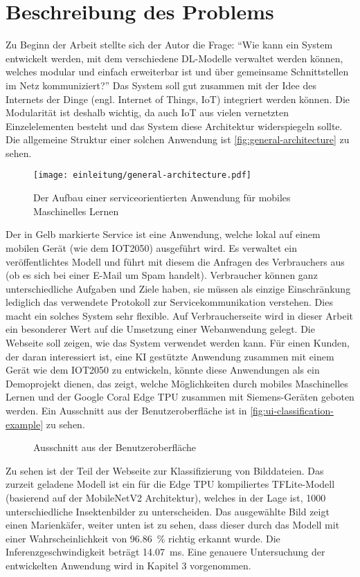 \section{Beschreibung des Problems}
Zu Beginn der Arbeit stellte sich der Autor die Frage:
\enquote{Wie kann ein System entwickelt werden, mit dem verschiedene DL-Modelle
  verwaltet werden können, welches modular und einfach erweiterbar ist
  und über gemeinsame Schnittstellen im Netz kommuniziert?}
Das System soll gut zusammen mit der Idee des Internets der Dinge
(engl. Internet of Things, IoT) integriert werden können.
Die Modularität ist deshalb wichtig, da auch IoT aus vielen vernetzten
Einzelelementen besteht und das System diese Architektur widerspiegeln sollte.
Die allgemeine Struktur einer solchen Anwendung ist \autoref{fig:general-architecture} zu
sehen. 
\begin{figure}[h!]
  \centering
  \texttt{[image: einleitung/general-architecture.pdf]}
  \caption{Der Aufbau einer serviceorientierten Anwendung für mobiles Maschinelles Lernen}
  \label{fig:general-architecture}
\end{figure}

\noindent
Der in Gelb markierte Service ist eine Anwendung, welche
lokal auf einem mobilen Gerät (wie dem IOT2050) ausgeführt wird.
Es verwaltet ein veröffentlichtes Modell und führt mit diesem
die Anfragen des Verbrauchers aus (\zB ob es sich bei einer E-Mail um Spam handelt).
Verbraucher können ganz unterschiedliche Aufgaben und Ziele haben, sie müssen
als einzige Einschränkung lediglich das verwendete Protokoll
zur Servicekommunikation verstehen.
Dies macht ein solches System sehr flexible.
Auf Verbraucherseite wird in dieser Arbeit
ein besonderer Wert auf die Umsetzung einer Webanwendung gelegt.
Die Webseite soll zeigen, wie das System verwendet
werden kann. Für einen Kunden, der daran interessiert ist, eine
KI gestützte Anwendung zusammen mit einem Gerät wie dem IOT2050
zu entwickeln, könnte diese Anwendungen als ein Demoprojekt dienen,
das zeigt, welche Möglichkeiten durch mobiles
Maschinelles Lernen und der Google Coral Edge TPU zusammen mit Siemens-Geräten
geboten werden.
Ein Ausschnitt aus der Benutzeroberfläche ist in
\autoref{fig:ui-classification-example} zu sehen.
\newpage
\begin{figure}[h!]
  \centering
  \caption{Ausschnitt aus der Benutzeroberfläche}
  \label{fig:ui-classification-example}
\end{figure}
\noindent
Zu sehen ist der Teil der Webseite zur Klassifizierung von Bilddateien.
Das zurzeit geladene Modell ist ein für die Edge TPU kompiliertes
TFLite-Modell (basierend auf der MobileNetV2 Architektur),
welches in der Lage ist, 1000 unterschiedliche
Insektenbilder zu unterscheiden. Das ausgewählte Bild zeigt
einen Marienkäfer, weiter unten ist zu sehen, dass dieser durch das Modell mit
einer Wahrscheinlichkeit von \qty{96.86}{\percent} richtig erkannt wurde.
Die Inferenzgeschwindigkeit beträgt \qty{14.07}{\milli\second}.
Eine genauere Untersuchung der entwickelten Anwendung wird
in Kapitel 3 vorgenommen.